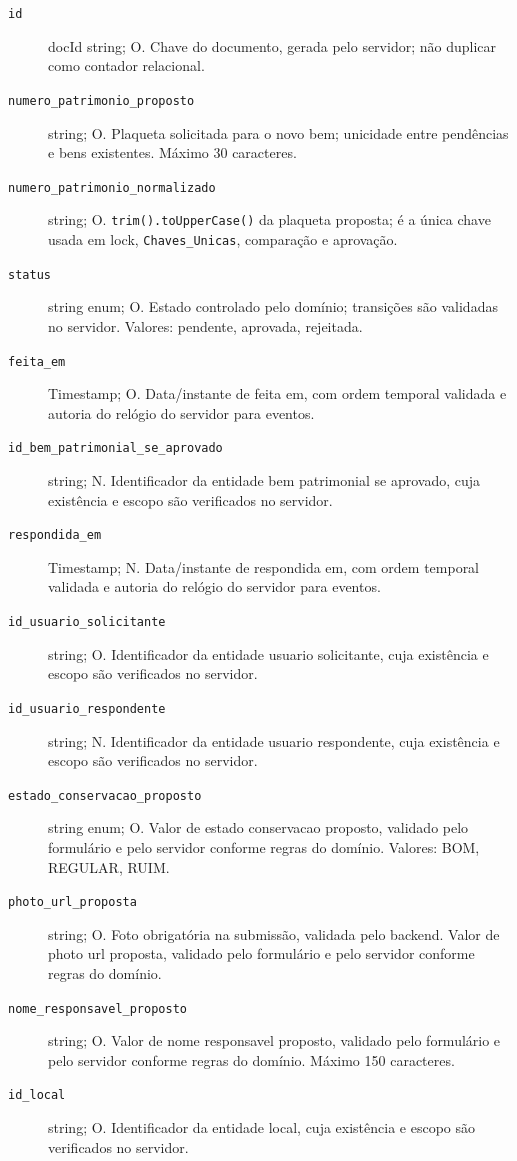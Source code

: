 \begin{description}
\item[\texttt{id}] docId string; O. Chave do documento, gerada pelo servidor; não duplicar como contador relacional.
\item[\texttt{numero\_patrimonio\_proposto}] string; O. Plaqueta solicitada para o novo bem; unicidade entre pendências e bens existentes. Máximo 30 caracteres.
\item[\texttt{numero\_patrimonio\_normalizado}] string; O. \texttt{trim().toUpperCase()} da plaqueta proposta; é a única chave usada em lock, \texttt{Chaves\_Unicas}, comparação e aprovação.
\item[\texttt{status}] string enum; O. Estado controlado pelo domínio; transições são validadas no servidor. Valores: pendente, aprovada, rejeitada.
\item[\texttt{feita\_em}] Timestamp; O. Data/instante de feita em, com ordem temporal validada e autoria do relógio do servidor para eventos.
\item[\texttt{id\_bem\_patrimonial\_se\_aprovado}] string; N. Identificador da entidade bem patrimonial se aprovado, cuja existência e escopo são verificados no servidor.
\item[\texttt{respondida\_em}] Timestamp; N. Data/instante de respondida em, com ordem temporal validada e autoria do relógio do servidor para eventos.
\item[\texttt{id\_usuario\_solicitante}] string; O. Identificador da entidade usuario solicitante, cuja existência e escopo são verificados no servidor.
\item[\texttt{id\_usuario\_respondente}] string; N. Identificador da entidade usuario respondente, cuja existência e escopo são verificados no servidor.
\item[\texttt{estado\_conservacao\_proposto}] string enum; O. Valor de estado conservacao proposto, validado pelo formulário e pelo servidor conforme regras do domínio. Valores: BOM, REGULAR, RUIM.
\item[\texttt{photo\_url\_proposta}] string; O. Foto obrigatória na submissão, validada pelo backend. Valor de photo url proposta, validado pelo formulário e pelo servidor conforme regras do domínio.
\item[\texttt{nome\_responsavel\_proposto}] string; O. Valor de nome responsavel proposto, validado pelo formulário e pelo servidor conforme regras do domínio. Máximo 150 caracteres.
\item[\texttt{id\_local}] string; O. Identificador da entidade local, cuja existência e escopo são verificados no servidor.

\end{description}

